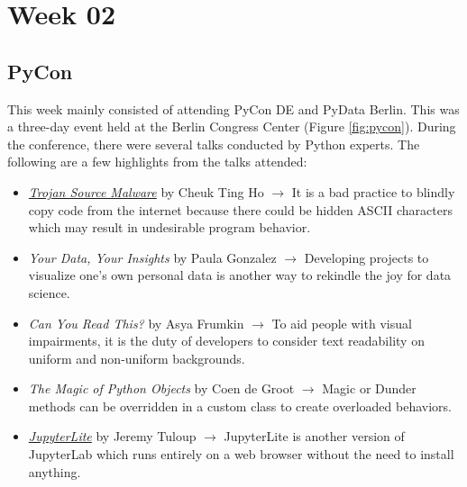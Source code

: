\chapter{Week 02} %

\section{PyCon}
    
    
    This week mainly consisted of attending PyCon DE and PyData Berlin. This was a three-day event held at the Berlin Congress Center (Figure \ref{fig:pycon}). During the conference, there were several talks conducted by Python experts. The following are a few highlights from the talks attended:
    \begin{itemize}
        \item \href{https://player.vimeo.com/video/698423690}{\textit{Trojan Source Malware}} by Cheuk Ting Ho $\rightarrow$ It is a bad practice to blindly copy code from the internet because there could be hidden ASCII characters which may result in undesirable program behavior.
        \item \textit{Your Data, Your Insights} by Paula Gonzalez $\rightarrow$ Developing projects to visualize one's own personal data is another way to rekindle the joy for data science.
        \item \textit{Can You Read This?} by Asya Frumkin $\rightarrow$ To aid people with visual impairments, it is the duty of developers to consider text readability on uniform and non-uniform backgrounds.
        \item \textit{The Magic of Python Objects} by Coen de Groot $\rightarrow$ Magic or Dunder methods can be overridden in a custom class to create overloaded behaviors. 
        \item \href{https://blog.jupyter.org/jupyterlite-jupyter-%EF%B8%8F-webassembly-%EF%B8%8F-python-f6e2e41ab3fa}{\textit{JupyterLite}} by Jeremy Tuloup $\rightarrow$ JupyterLite is another version of JupyterLab which runs entirely on a web browser without the need to install anything. 
    \end{itemize} 
    
